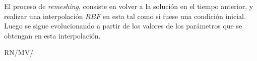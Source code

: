 \documentclass[spanish]{article}
\begin{document}
    El proceso de \textit{remeshing}, consiste en volver a la solución en el tiempo anterior, y realizar una interpolación $RBF$ en esta tal como si fuese una condición inicial. Luego se sigue evolucionando a partir de los valores de los parámetros que se obtengan en esta interpolación.



\newpage

 

\vfill\hfill RN/MV/\LaTeXe
\end{document}
